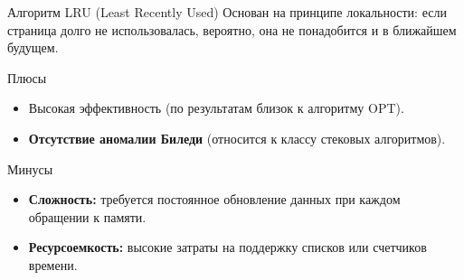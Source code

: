 \documentclass[10pt,pdf,hyperref={unicode}]{beamer}
\begin{document}
\begin{frame}{Алгоритм LRU (Least Recently Used)}
    Основан на принципе локальности: если страница долго не использовалась, вероятно, она не понадобится и в ближайшем будущем.

    \begin{block}{Плюсы}
        \begin{itemize}
            \item Высокая эффективность (по результатам близок к алгоритму OPT).
            \item \textbf{Отсутствие аномалии Биледи} (относится к классу стековых алгоритмов).
        \end{itemize}
    \end{block}

    \begin{alertblock}{Минусы}
        \begin{itemize}
            \item \textbf{Сложность:} требуется постоянное обновление данных при каждом обращении к памяти.
            \item \textbf{Ресурсоемкость:} высокие затраты на поддержку списков или счетчиков времени.
        \end{itemize}
    \end{alertblock}
\end{frame}
\end{document}
